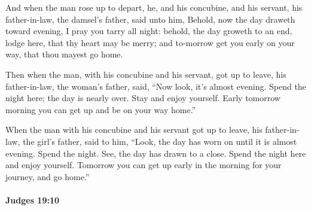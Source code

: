 			\begin{versebox}
					\item[BHS] 
					\item[ASV] And when the man rose up to depart, he, and his concubine, and his servant, his father-in-law, the damsel's father, said unto him, Behold, now the day draweth toward evening, I pray you tarry all night: behold, the day groweth to an end, lodge here, that thy heart may be merry; and to-morrow get you early on your way, that thou mayest go home.
					\item[NIV] Then when the man, with his concubine and his servant, got up to leave, his father-in-law, the woman’s father, said, “Now look, it’s almost evening. Spend the night here; the day is nearly over. Stay and enjoy yourself. Early tomorrow morning you can get up and be on your way home.”
					\item[NRSV] When the man with his concubine and his servant got up to leave, his father-in-law, the girl’s father, said to him, “Look, the day has worn on until it is almost evening. Spend the night. See, the day has drawn to a close. Spend the night here and enjoy yourself. Tomorrow you can get up early in the morning for your journey, and go home.”
			\end{versebox}

		\paragraph{Judges 19:10} %
			\label{JUDGES-19-10}

